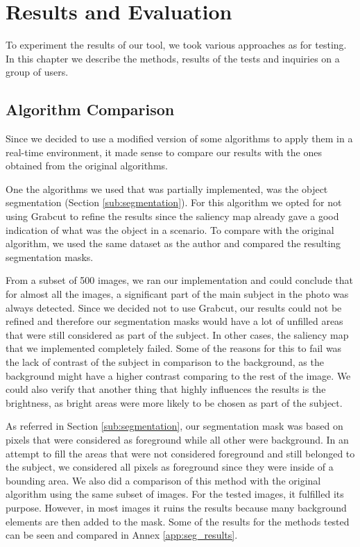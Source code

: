 \chapter{Results and Evaluation}
\label{cha:results}

To experiment the results of our tool, we took various approaches as for testing. In this chapter we describe the methods, results of the tests and inquiries on a group of users.

\section{Algorithm Comparison}

Since we decided to use a modified version of some algorithms to apply them in a real-time environment, it made sense to compare our results with the ones obtained from the original algorithms. 

One the algorithms we used that was partially implemented, was the object segmentation (Section \ref{sub:segmentation}). For this algorithm we opted for not using Grabcut \cite{rother2004grabcut} to refine the results since the saliency map already gave a good indication of what was the object in a scenario.  To compare with the original algorithm, we used the same dataset as the author and compared the resulting segmentation masks.

From a subset of 500 images, we ran our implementation and could conclude that for almost all the images, a significant part of the main subject in the photo was always detected. Since we decided not to use Grabcut, our results could not be refined and therefore our segmentation masks would have a lot of unfilled areas that were still considered as part of the subject. In other cases, the saliency map that we implemented completely failed. Some of the reasons for this to fail was the lack of contrast of the subject in comparison to the background, as the background might have a higher contrast comparing to the rest of the image. We could also verify that another thing that highly influences the results is the brightness, as bright areas were more likely to be chosen as part of the subject.

As referred in Section \ref{sub:segmentation}, our segmentation mask was based on pixels that were considered as foreground while all other were background. In an attempt to fill the areas that were not considered foreground and still belonged to the subject, we considered all pixels as foreground since they were inside of a bounding area. We also did a comparison of this  method with the original algorithm using the same subset of images. 
For the tested images, it fulfilled its purpose. However, in most images it ruins the results because many background elements are then added to the mask. Some of the results for the methods tested can be seen and compared in Annex \ref{app:seg_results}.


